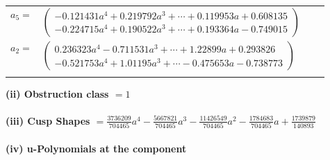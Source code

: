 \documentclass[1p]{elsarticle_modified}
\theoremstyle{definition}
\begin{document}
\begin{tabular}{m{7pt} m{180pt} m{7pt} m{180pt} }
\flushright $a_{5}=$&$\begin{pmatrix}-0.121431 a^{4}+0.219792 a^{3}+\cdots+0.119953 a+0.608135\\-0.224715 a^{4}+0.190522 a^{3}+\cdots+0.193364 a-0.749015\end{pmatrix}$ \\
\flushright $a_{2}=$&$\begin{pmatrix}0.236323 a^{4}-0.711531 a^{3}+\cdots+1.22899 a+0.293826\\-0.521753 a^{4}+1.01195 a^{3}+\cdots-0.475653 a-0.738773\end{pmatrix}$\\&\end{tabular}
\flushleft \textbf{(ii) Obstruction class $= 1$}\\~\\
\flushleft \textbf{(iii) Cusp Shapes $= \frac{3736209}{704465} a^4-\frac{5667821}{704465} a^3-\frac{11426549}{704465} a^2-\frac{1784683}{704465} a+\frac{1739879}{140893}$}\\~\\
\newpage\renewcommand{\arraystretch}{1}
\flushleft \textbf{(iv) u-Polynomials at the component}\newline \\
\end{document}
